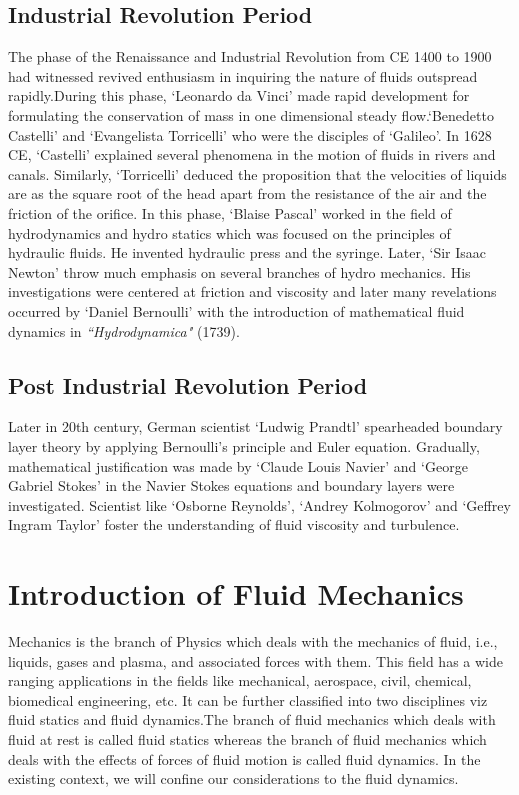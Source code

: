 \documentclass[14pt,one side, a4paper]{extbook}
\begin{document}
    \subsection{Industrial Revolution Period}
    The phase of the Renaissance and Industrial Revolution from CE 1400 to 1900 had witnessed revived enthusiasm in inquiring the nature of fluids outspread rapidly.During this phase, `Leonardo da Vinci' made rapid development for formulating the conservation of mass in one dimensional steady flow.`Benedetto Castelli' and `Evangelista Torricelli' who were the disciples of `Galileo'. In 1628 CE, `Castelli' explained several phenomena in the motion of fluids in rivers and canals. Similarly, `Torricelli' deduced the proposition that the velocities of liquids are as the square root of the head apart from the resistance of the air and the friction of the orifice.
	In this phase, `Blaise Pascal' worked in the field of hydrodynamics and hydro statics which was focused on the principles of hydraulic fluids. He invented hydraulic press and the syringe.
	Later, `Sir Isaac Newton' throw much emphasis on several branches of hydro mechanics. His investigations were centered at friction and viscosity and later many revelations occurred by `Daniel Bernoulli' with the introduction of mathematical fluid dynamics in \textit{``Hydrodynamica"} (1739).
	\subsection{Post Industrial Revolution Period} Later in 20th century, German scientist `Ludwig Prandtl' spearheaded boundary layer theory by applying Bernoulli's principle and Euler equation.
	Gradually, mathematical justification was made by `Claude Louis Navier' and `George Gabriel Stokes' in the Navier Stokes equations and boundary layers were investigated. Scientist like `Osborne Reynolds', `Andrey Kolmogorov' and `Geffrey Ingram Taylor' foster the understanding of fluid viscosity and turbulence.
	\section{Introduction of Fluid Mechanics}
	Mechanics is the branch of Physics which deals with the mechanics of fluid, i.e., liquids, gases and plasma, and associated forces with them. This field has a wide ranging applications in the fields like mechanical, aerospace, civil, chemical, biomedical engineering, etc. It can be further classified into two disciplines viz fluid statics and fluid dynamics.The branch of fluid mechanics which deals with fluid at rest is called fluid statics whereas the branch of fluid mechanics which deals with the effects of forces of fluid motion is called fluid dynamics. In the existing context, we will confine our considerations to the fluid dynamics.
\end{document}
